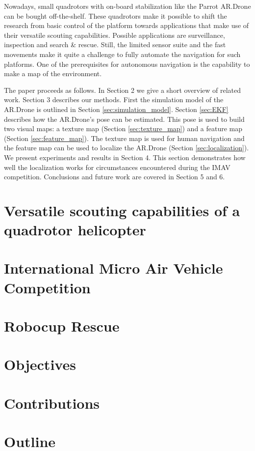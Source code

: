 Nowadays, small quadrotors with on-board stabilization like the Parrot AR.Drone can be bought off-the-shelf.
These quadrotors make it possible to shift the research from basic control of the platform towards applications that make use of their versatile scouting capabilities. Possible applications are surveillance, inspection and search \& rescue. Still, the limited sensor suite and the fast movements make it quite a challenge to fully automate the navigation for such platforms. One of the prerequisites for autonomous navigation is the capability to make a map of the environment. 

The paper proceeds as follows. 
In Section 2 we give a short overview of related work.
Section 3 describes our methods.
First the simulation model of the AR.Drone is outlined in Section \ref{sec:simulation_model}.
Section \ref{sec:EKF} describes how the AR.Drone's pose can be estimated.
This pose is used to build two visual maps: a texture map (Section \ref{sec:texture_map}) and a feature map (Section \ref{sec:feature_map}).
The texture map is used for human navigation and the feature map can be used to localize the AR.Drone (Section \ref{sec:localization}).
We present experiments and results in Section 4.
This section demonstrates how well the localization works for circumstances encountered during the IMAV competition. 
Conclusions and future work are covered in Section 5 and 6.

	\section{Versatile scouting capabilities of a quadrotor helicopter}
	\section{International Micro Air Vehicle Competition}
	\section{Robocup Rescue}
	\section{Objectives}
	\section{Contributions}
	\section{Outline}